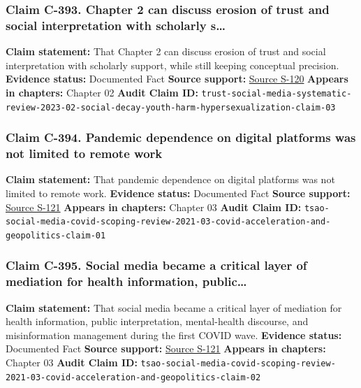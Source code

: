 \documentclass[
  american,
  11pt,
  letterpaper,
]{article}
\begin{document}
\subsubsection{Claim C-393. Chapter 2 can discuss erosion of trust and
social interpretation with scholarly
s\ldots{}}\label{claim-c-393-chapter-2-can-discuss-erosion-of-trust-and-social-interpretation-with-scholarly-s}

\textbf{Claim statement:} That Chapter 2 can discuss erosion of trust
and social interpretation with scholarly support, while still keeping
conceptual precision. \textbf{Evidence status:} Documented Fact
\textbf{Source support:}
\hyperref[source-s-120-what-do-we-mean-when-we-talk-about-trust-in-social-media-a-systematic-review]{Source
S-120} \textbf{Appears in chapters:} Chapter 02 \textbf{Audit Claim ID:}
\texttt{trust-social-media-systematic-review-2023-02-social-decay-youth-harm-hypersexualization-claim-03}

\subsubsection{Claim C-394. Pandemic dependence on digital platforms was
not limited to remote
work}\label{claim-c-394-pandemic-dependence-on-digital-platforms-was-not-limited-to-remote-work}

\textbf{Claim statement:} That pandemic dependence on digital platforms
was not limited to remote work. \textbf{Evidence status:} Documented
Fact \textbf{Source support:}
\hyperref[source-s-121-what-social-media-told-about-us-in-the-time-of-covid-19-a-scoping-review]{Source
S-121} \textbf{Appears in chapters:} Chapter 03 \textbf{Audit Claim ID:}
\texttt{tsao-social-media-covid-scoping-review-2021-03-covid-acceleration-and-geopolitics-claim-01}

\subsubsection{Claim C-395. Social media became a critical layer of
mediation for health information,
public\ldots{}}\label{claim-c-395-social-media-became-a-critical-layer-of-mediation-for-health-information-public}

\textbf{Claim statement:} That social media became a critical layer of
mediation for health information, public interpretation, mental-health
discourse, and misinformation management during the first COVID wave.
\textbf{Evidence status:} Documented Fact \textbf{Source support:}
\hyperref[source-s-121-what-social-media-told-about-us-in-the-time-of-covid-19-a-scoping-review]{Source
S-121} \textbf{Appears in chapters:} Chapter 03 \textbf{Audit Claim ID:}
\texttt{tsao-social-media-covid-scoping-review-2021-03-covid-acceleration-and-geopolitics-claim-02}
\end{document}
